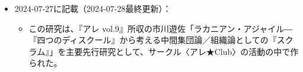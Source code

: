 \begin{itemize}
\tightlist
\item
  2024-07-27に記載（2024-07-28最終更新）：

  \begin{itemize}
  \tightlist
  \item
    この研究は、『アレ
    vol.9』所収の市川遊佐「ラカニアン・アジャイル―『四つのディスクール』から考える中間集団論／組織論としての『スクラム』」を主要先行研究として、サークル〈アレ★Club〉の活動の中で作られた。
  \end{itemize}
\end{itemize}
